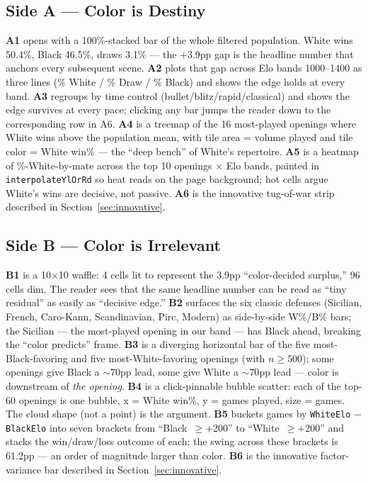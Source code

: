 \documentclass[sigconf,nonacm,natbib=false]{acmart}
\begin{document}
\subsection{Side A --- Color is Destiny}

\textbf{A1} opens with a 100\%-stacked bar of the whole filtered
population. White wins 50.4\%, Black 46.5\%, draws 3.1\% --- the
+3.9pp gap is the headline number that anchors every subsequent
scene. \textbf{A2} plots that gap across Elo bands 1000--1400 as
three lines (\% White / \% Draw / \% Black) and shows the edge
holds at every band. \textbf{A3} regroups by time control
(bullet/blitz/rapid/classical) and shows the edge survives at every
pace; clicking any bar jumps the reader down to the corresponding
row in A6. \textbf{A4} is a treemap of the 16 most-played openings
where White wins above the population mean, with tile area = volume
played and tile color = White win\% --- the ``deep bench'' of
White's repertoire. \textbf{A5} is a heatmap of \%-White-by-mate
across the top 10 openings $\times$ Elo bands, painted in
\texttt{interpolateYlOrRd} so heat reads on the page background;
hot cells argue White's wins are decisive, not passive. \textbf{A6}
is the innovative tug-of-war strip described in
Section~\ref{sec:innovative}.

\subsection{Side B --- Color is Irrelevant}

\textbf{B1} is a 10$\times$10 waffle: 4 cells lit to represent the
3.9pp ``color-decided surplus,'' 96 cells dim. The reader sees
that the same headline number can be read as ``tiny residual'' as
easily as ``decisive edge.'' \textbf{B2} surfaces the six classic
defenses (Sicilian, French, Caro-Kann, Scandinavian, Pirc, Modern)
as side-by-side W\%/B\% bars; the Sicilian --- the most-played
opening in our band --- has Black ahead, breaking the ``color
predicts'' frame. \textbf{B3} is a diverging horizontal bar of the
five most-Black-favoring and five most-White-favoring openings (with
$n \geq 500$); some openings give Black a $\sim 70$pp lead, some
give White a $\sim 70$pp lead --- color is downstream of \emph{the
opening}. \textbf{B4} is a click-pinnable bubble scatter: each of
the top-60 openings is one bubble, x = White win\%, y = games
played, size = games. The cloud shape (not a point) is the
argument. \textbf{B5} buckets games by \texttt{WhiteElo} $-$
\texttt{BlackElo} into seven brackets from ``Black~$\geq$+200'' to
``White~$\geq$+200'' and stacks the win/draw/loss outcome of each;
the swing across these brackets is 61.2pp --- an order of
magnitude larger than color. \textbf{B6} is the innovative
factor-variance bar described in Section~\ref{sec:innovative}.
\end{document}
